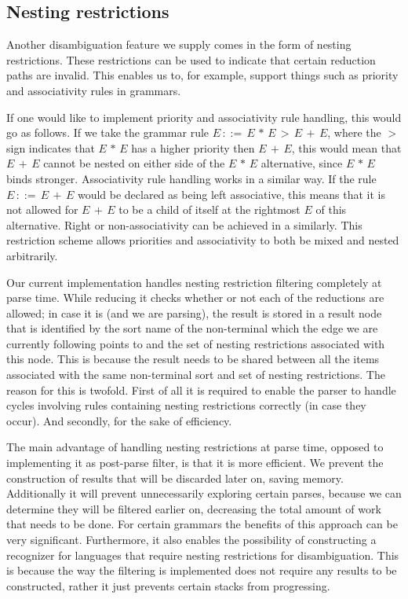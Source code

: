 \documentclass[a4paper,10pt]{article}
\begin{document}
\subsection{Nesting restrictions}

Another disambiguation feature we supply comes in the form of nesting restrictions. These restrictions can be used to indicate that certain reduction paths are invalid. This enables us to, for example, support things such as priority and associativity rules in grammars.

If one would like to implement priority and associativity rule handling, this would go as follows. If we take the grammar rule $E\,::=\,E\,*\,E\,>\,E\,+\,E$, where the $>$ sign indicates that $E\,*\,E$ has a higher priority then $E\,+\,E$, this would mean that $E\,+\,E$ cannot be nested on either side of the $E\,*\,E$ alternative, since $E\,*\,E$ binds stronger. Associativity rule handling works in a similar way. If the rule $E\,::=\,E\,+\,E$ would be declared as being left associative, this means that it is not allowed for $E\,+\,E$ to be a child of itself at the rightmost $E$ of this alternative. Right or non-associativity can be achieved in a similarly. This restriction scheme allows priorities and associativity to both be mixed and nested arbitrarily.

Our current implementation handles nesting restriction filtering completely at parse time. While reducing it checks whether or not each of the reductions are allowed; in case it is (and we are parsing), the result is stored in a result node that is identified by the sort name of the non-terminal which the edge we are currently following points to and the set of nesting restrictions associated with this node. This is because the result needs to be shared between all the items associated with the same non-terminal sort and set of nesting restrictions. The reason for this is twofold. First of all it is required to enable the parser to handle cycles involving rules containing nesting restrictions correctly (in case they occur). And secondly, for the sake of efficiency.

The main advantage of handling nesting restrictions at parse time, opposed to implementing it as post-parse filter, is that it is more efficient. We prevent the construction of results that will be discarded later on, saving memory. Additionally it will prevent unnecessarily exploring certain parses, because we can determine they will be filtered earlier on, decreasing the total amount of work that needs to be done. For certain grammars the benefits of this approach can be very significant. Furthermore, it also enables the possibility of constructing a recognizer for languages that require nesting restrictions for disambiguation. This is because the way the filtering is implemented does not require any results to be constructed, rather it just prevents certain stacks from progressing.
\end{document}
